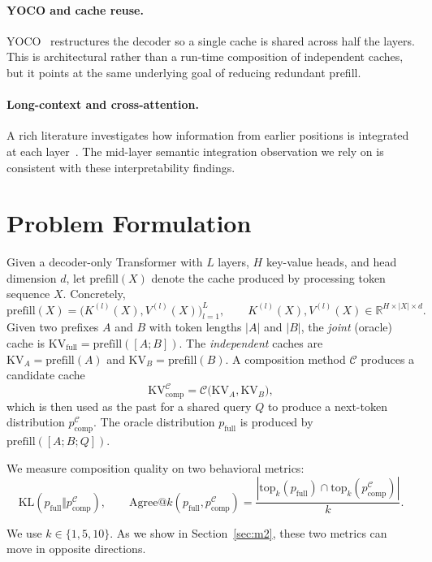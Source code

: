 \documentclass[11pt]{article}
\begin{document}
\paragraph{YOCO and cache reuse.} YOCO~\citep{sun2024yoco} restructures the decoder so a single cache is shared across half the layers. This is architectural rather than a run-time composition of independent caches, but it points at the same underlying goal of reducing redundant prefill.

\paragraph{Long-context and cross-attention.} A rich literature investigates how information from earlier positions is integrated at each layer~\citep{elhage2022superposition,olah2022attention}. The mid-layer semantic integration observation we rely on is consistent with these interpretability findings.

\section{Problem Formulation}

Given a decoder-only Transformer with $L$ layers, $H$ key-value heads, and head dimension $d$, let $\mathrm{prefill}(X)$ denote the cache produced by processing token sequence $X$. Concretely,
\[
\mathrm{prefill}(X) = \bigl( K^{(l)}(X), V^{(l)}(X) \bigr)_{l=1}^L,
\qquad
K^{(l)}(X), V^{(l)}(X) \in \mathbb{R}^{H \times |X| \times d}.
\]
Given two prefixes $A$ and $B$ with token lengths $|A|$ and $|B|$, the \emph{joint} (oracle) cache is
$\mathrm{KV}_{\text{full}} = \mathrm{prefill}([A;B])$. The \emph{independent} caches are $\mathrm{KV}_A = \mathrm{prefill}(A)$ and $\mathrm{KV}_B = \mathrm{prefill}(B)$. A composition method $\mathcal{C}$ produces a candidate cache
\[
\mathrm{KV}_{\text{comp}}^{\mathcal{C}} = \mathcal{C}\bigl( \mathrm{KV}_A, \mathrm{KV}_B \bigr),
\]
which is then used as the past for a shared query $Q$ to produce a next-token distribution $p_{\text{comp}}^{\mathcal{C}}$. The oracle distribution $p_{\text{full}}$ is produced by $\mathrm{prefill}([A;B;Q])$.

We measure composition quality on two behavioral metrics:
\[
\mathrm{KL}(p_{\text{full}} \Vert p_{\text{comp}}^{\mathcal{C}}),
\qquad
\mathrm{Agree@}k(p_{\text{full}}, p_{\text{comp}}^{\mathcal{C}})
= \frac{|\mathrm{top}_k(p_{\text{full}}) \cap \mathrm{top}_k(p_{\text{comp}}^{\mathcal{C}})|}{k}.
\]

We use $k \in \{1, 5, 10\}$. As we show in Section~\ref{sec:m2}, these two metrics can move in opposite directions.
\end{document}
